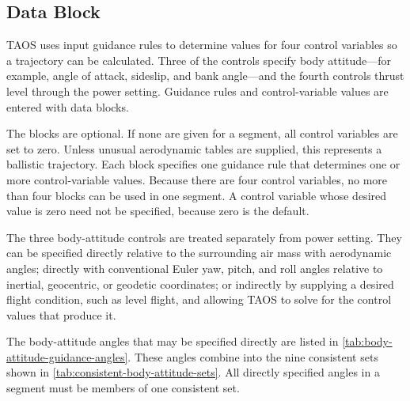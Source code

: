 \subsection{ Data Block}\label{sec:block-fly}

TAOS uses input guidance rules to determine values for four control variables so a
trajectory can be calculated. Three of the controls specify body attitude---for
example, angle of attack, sideslip, and bank angle---and the fourth controls thrust
level through the power setting. Guidance rules and control-variable values are
entered with  data blocks.

The  blocks are optional. If none are given for a segment, all
control variables are set to zero. Unless unusual aerodynamic tables are supplied,
this represents a ballistic trajectory. Each  block specifies one
guidance rule that determines one or more control-variable values. Because there are
four control variables, no more than four  blocks can be used in
one segment. A control variable whose desired value is zero need not be specified,
because zero is the default.


The three body-attitude controls are treated separately from power setting. They can
be specified directly relative to the surrounding air mass with aerodynamic angles;
directly with conventional Euler yaw, pitch, and roll angles relative to inertial,
geocentric, or geodetic coordinates; or indirectly by supplying a desired flight
condition, such as level flight, and allowing TAOS to solve for the control values
that produce it.

The body-attitude angles that may be specified directly are listed in
\cref{tab:body-attitude-guidance-angles}. These angles combine into the nine
consistent sets shown in \cref{tab:consistent-body-attitude-sets}. All directly
specified angles in a segment must be members of one consistent set.


